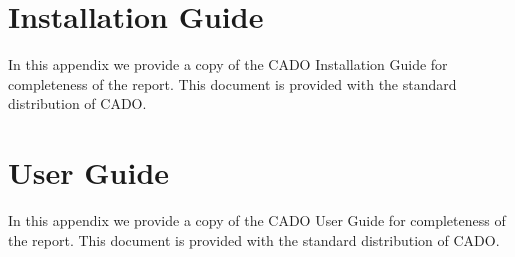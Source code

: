 \documentclass[11pt,a4paper,bibtotoc,idxtotoc,headsepline,footsepline,footexclude,DIV13,oneside]{scrbook}
\begin{document}
	\frontmatter
	
	
	
	
	
	
	
	
	
	\listoftodos
	\tableofcontents
   	

	\mainmatter
	
				
		
		
		
		
		
		
 
		
		
		
		\appendix 
		
		\chapter{Installation Guide}
		\label{app:installationGuide}
	        In this appendix we provide a copy of the CADO Installation Guide for completeness of the report. This document is provided with the standard distribution of CADO.
		
		\chapter{User Guide}
		\label{app:userGuide}
		In this appendix we provide a copy of the CADO User Guide for completeness of the report. This document is provided with the standard distribution of CADO.
		
		
\end{document}
